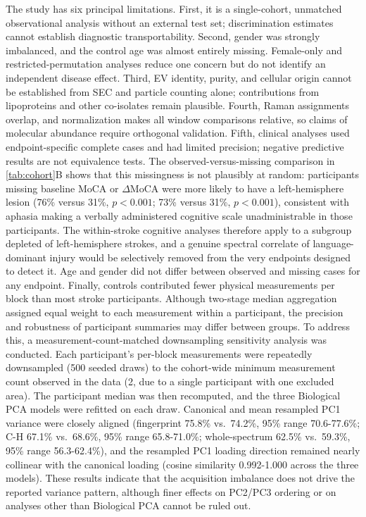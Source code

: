 \documentclass[preprint,12pt]{elsarticle}
\begin{document}
The study has six principal limitations. First, it is a single-cohort, unmatched observational analysis without an external test set; discrimination estimates cannot establish diagnostic transportability. Second, gender was strongly imbalanced, and the control age was almost entirely missing. Female-only and restricted-permutation analyses reduce one concern but do not identify an independent disease effect. Third, EV identity, purity, and cellular origin cannot be established from SEC and particle counting alone; contributions from lipoproteins and other co-isolates remain plausible. Fourth, Raman assignments overlap, and normalization makes all window comparisons relative, so claims of molecular abundance require orthogonal validation. Fifth, clinical analyses used endpoint-specific complete cases and had limited precision; negative predictive results are not equivalence tests. The observed-versus-missing comparison in \cref{tab:cohort}B shows that this missingness is not plausibly at random: participants missing baseline MoCA or $\Delta$MoCA were more likely to have a left-hemisphere lesion (76\% versus 31\%, $p<0.001$; 73\% versus 31\%, $p<0.001$), consistent with aphasia making a verbally administered cognitive scale unadministrable in those participants. The within-stroke cognitive analyses therefore apply to a subgroup depleted of left-hemisphere strokes, and a genuine spectral correlate of language-dominant injury would be selectively removed from the very endpoints designed to detect it. Age and gender did not differ between observed and missing cases for any endpoint. Finally, controls contributed fewer physical measurements per block than most stroke participants. Although two-stage median aggregation assigned equal weight to each measurement within a participant, the precision and robustness of participant summaries may differ between groups. To address this, a measurement-count-matched downsampling sensitivity analysis was conducted. Each participant's per-block measurements were repeatedly downsampled (500 seeded draws) to the cohort-wide minimum measurement count observed in the data (2, due to a single participant with one excluded area). The participant median was then recomputed, and the three Biological PCA models were refitted on each draw. Canonical and mean resampled PC1 variance were closely aligned (fingerprint 75.8\% vs.\ 74.2\%, 95\% range 70.6-77.6\%; C-H 67.1\% vs.\ 68.6\%, 95\% range 65.8-71.0\%; whole-spectrum 62.5\% vs.\ 59.3\%, 95\% range 56.3-62.4\%), and the resampled PC1 loading direction remained nearly collinear with the canonical loading (cosine similarity 0.992-1.000 across the three models). These results indicate that the acquisition imbalance does not drive the reported variance pattern, although finer effects on PC2/PC3 ordering or on analyses other than Biological PCA cannot be ruled out. 
\end{document}
